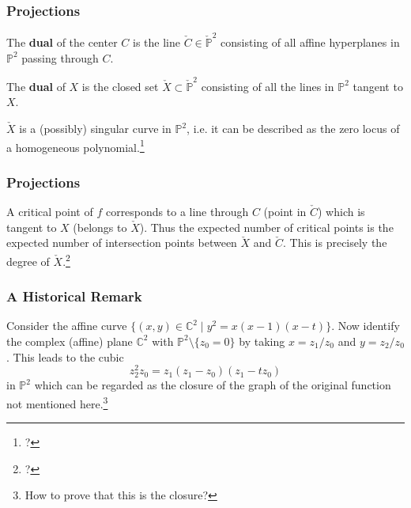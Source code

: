 \documentclass{beamer}
\begin{document}
\begin{frame}
\frametitle{Projections}

The \textbf{dual} of the center $C$ is the line $\check{C}\in \check{\mathbb{P}}^2$ consisting of all affine hyperplanes in $\mathbb{P}^2$ passing through $C$.

\phantom{?}

The \textbf{dual} of $X$ is the closed set $\check{X} \subset \check{\mathbb{P}}^2$ consisting of all the lines in $\mathbb{P}^2$ tangent to $X$.

\phantom{?}

$\check{X}$ is a (possibly) singular curve in $\mathbb{P}^2$, i.e. it can be described as the zero locus of a homogeneous polynomial.\footnote{?}

\end{frame}


\begin{frame}
\frametitle{Projections}

A critical point of $f$ corresponds to a line through $C$ (point in $\check{C}$) which is tangent to $X$ (belongs to $\check{X}$). Thus the expected number of critical points is the expected number of intersection points between $\check{X}$ and $\check{C}$. This is precisely the degree of $\check{X}$.\footnote{?}

\end{frame}

\begin{frame}
\frametitle{A Historical Remark}

Consider the affine curve $\{(x,y) \in \mathbb{C}^2 \mid y^2 = x(x-1)(x-t)\}$. Now identify the complex (affine) plane $\mathbb{C}^2$ with $\mathbb{P}^2 \setminus \{z_0 = 0\}$ by taking $x = z_1/z_0$ and $y = z_2/z_0$. This leads to the cubic \[z_2^2z_0 = z_1(z_1-z_0)(z_1-tz_0)\] in $\mathbb{P}^2$ which can be regarded as the closure of the graph of the original function not mentioned here.\footnote{How to prove that this is the closure?}

\end{frame}
\end{document}
